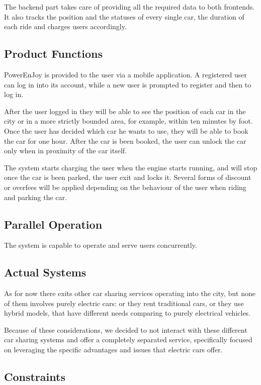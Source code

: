 \documentclass[11pt]{article} %
\newcommand{\pe}{PowerEnJoy }
\begin{document}
  The backend part takes care of providing all the required data to both frontends. It also tracks the position and the statuses of every single car, the duration of each ride and charges users accordingly.
  
\subsection{Product Functions}
  
  \pe is provided to the user via a mobile application. A registered user can log in into its account, while a new user is prompted to register and then to log in.
  
  After the user logged in they will be able to see the position of each car in the city or in a more strictly bounded area, for example, within ten minutes by foot. Once the user has decided which car he wants to use, they will be able to book the car for one hour. After the car is been booked, the user can unlock the car only when in proximity of the car itself.
  
  The system starts charging the user when the engine starts running, and will stop once the car is been parked, the user exit and locks it. Several forms of discount or overfees will be applied depending on the behaviour of the user when riding and parking the car.


\subsection{Parallel Operation}
  The system is capable to operate and serve users concurrently.

\subsection{Actual Systems}
As for now there exits other car sharing services operating into the city, but none of them involves purely electric cars: or they rent traditional cars, or they use hybrid models, that have different needs comparing to purely electrical vehicles.

Because of these considerations, we decided to not interact with these different car sharing systems and offer a completely separated service, specifically focused on leveraging the specific advantages and issues that electric cars offer.

 
\subsection{Constraints}
  
\end{document}
